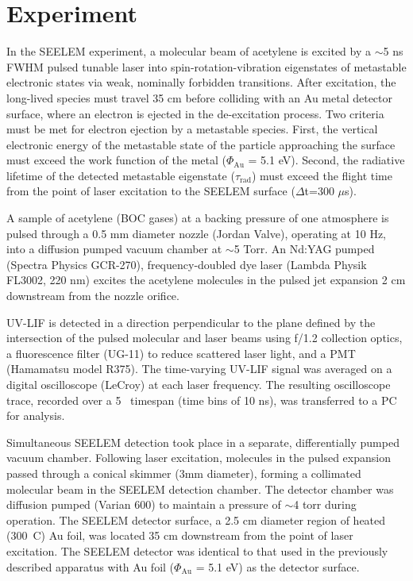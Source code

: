 \section{Experiment}

In the SEELEM experiment, a molecular beam of acetylene is excited by
a $\sim$5 ns FWHM pulsed tunable laser into spin-rotation-vibration
eigenstates of metastable electronic states via weak, nominally
forbidden transitions. After excitation, the long-lived species must
travel 35 cm before colliding with an Au metal detector surface, where
an electron is ejected in the de-excitation process. Two criteria must
be met for electron ejection by a metastable species. First, the
vertical electronic energy of the metastable state of the particle
approaching the surface must exceed the work function of the metal
($\Phi_{\text{Au}}$ = 5.1 eV). Second, the radiative lifetime of the
detected metastable eigenstate ($\tau_\text{rad}$) must exceed the
flight time from the point of laser excitation to the SEELEM surface
($\Delta$t=300 $\mu$s).

A sample of acetylene (BOC gases) at a backing pressure of one
atmosphere is pulsed through a 0.5 mm diameter nozzle (Jordan Valve),
operating at 10 Hz, into a diffusion pumped vacuum chamber at
$\sim$5 Torr.  An Nd:YAG pumped (Spectra Physics GCR-270),
frequency-doubled dye laser (Lambda Physik FL3002, 220 nm) excites the
acetylene molecules in the pulsed jet expansion 2 cm downstream from
the nozzle orifice.  %

UV-LIF is detected in a direction perpendicular to the plane defined by the
intersection of the pulsed molecular and laser beams using f/1.2
collection optics, a fluorescence filter (UG-11) to reduce scattered
laser light, and a PMT (Hamamatsu model R375).  The time-varying
UV-LIF signal was averaged on a digital oscilloscope (LeCroy) 
at each laser frequency.  The resulting oscilloscope trace,
recorded over a 5 \microsec\ timespan (time bins of 10 ns), was
transferred to a PC for analysis.

Simultaneous SEELEM detection took place in a separate, differentially
pumped vacuum chamber.  Following laser excitation, molecules in the
pulsed expansion passed through a conical skimmer (3mm diameter),
forming a collimated molecular beam in the SEELEM detection chamber.
The detector chamber was diffusion pumped (Varian 600) to maintain a
pressure of $\sim$4 torr during operation.  The SEELEM detector
surface, a 2.5 cm diameter region of heated (300\degrees\ C) Au foil,
was located 35 cm downstream from the point of laser excitation.  The
SEELEM detector was identical to that used in the previously described
apparatus with Au foil ($\Phi_{\text{Au}}$ = 5.1 eV) as the detector
surface.


